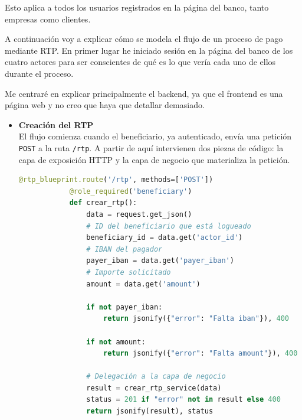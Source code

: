 Esto aplica a todos los usuarios registrados en la página del banco, tanto empresas como clientes.

A continuación voy a explicar cómo se modela el flujo de un proceso de pago mediante RTP. En primer lugar he iniciado sesión en la página del banco de los cuatro actores para ser conscientes de qué es lo que vería cada uno de ellos durante el proceso.

Me centraré en explicar principalmente el backend, ya que el frontend es una página web y no creo que haya que detallar demasiado.

\begin{itemize}
    \item \textbf{Creación del RTP}\\[6pt]
        El flujo comienza cuando el beneficiario, ya autenticado, envía una
        petición \texttt{POST} a la ruta \texttt{/rtp}.  
        A partir de aquí intervienen dos piezas de código: la capa de
        exposición HTTP y la capa de negocio que materializa la petición.
        \vspace{0.6em}

       \begin{lstlisting}[language=Python, style=custom, caption={Endpoint creación de solicitud RTP}]
            @rtp_blueprint.route('/rtp', methods=['POST'])
            @role_required('beneficiary')
            def crear_rtp():
                data = request.get_json()
                # ID del beneficiario que está logueado
                beneficiary_id = data.get('actor_id')
                # IBAN del pagador
                payer_iban = data.get('payer_iban')
                # Importe solicitado
                amount = data.get('amount')

                if not payer_iban:
                    return jsonify({"error": "Falta iban"}), 400

                if not amount:
                    return jsonify({"error": "Falta amount"}), 400

                # Delegación a la capa de negocio
                result = crear_rtp_service(data)
                status = 201 if "error" not in result else 400
                return jsonify(result), status
        \end{lstlisting}


\end{itemize}
